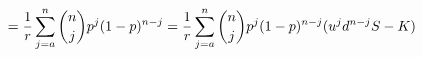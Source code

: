 \documentclass[preview]{standalone}
\begin{document}
\begin{align*}
= {1 \over r} \sum^{n}_{j=a} {{n}\choose{j}} p^{j} (1-p)^{n-j} = {1 \over r} \sum^{n}_{j=a} {{n}\choose{j}} p^{j} (1-p)^{n-j} ( u^{j} d^{n-j} S - K )
\end{align*}
\end{document}
